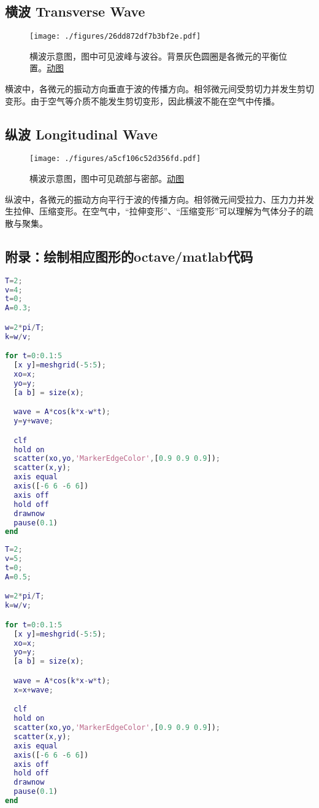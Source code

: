 
\subsection{横波 Transverse Wave}
\begin{figure}[ht]
\centering
\texttt{[image: ./figures/26dd872df7b3bf2e.pdf]}
\caption{横波示意图，图中可见波峰与波谷。背景灰色圆圈是各微元的平衡位置。\href{https://wuli.wiki/apps/waves.html}{动图}} \label{fig_LAT_1}
\end{figure}
横波中，各微元的振动方向垂直于波的传播方向。相邻微元间受剪切力并发生剪切变形。由于空气等介质不能发生剪切变形，因此横波不能在空气中传播。

\subsection{纵波 Longitudinal Wave}
\begin{figure}[ht]
\centering
\texttt{[image: ./figures/a5cf106c52d356fd.pdf]}
\caption{横波示意图，图中可见疏部与密部。\href{https://wuli.wiki/apps/waves.html}{动图}} \label{fig_LAT_2}
\end{figure}
纵波中，各微元的振动方向平行于波的传播方向。相邻微元间受拉力、压力力并发生拉伸、压缩变形。在空气中，“拉伸变形”、“压缩变形”可以理解为气体分子的疏散与聚集。

\subsection{附录：绘制相应图形的octave/matlab代码}
\begin{lstlisting}[language=matlab]
%绘制横波
T=2;
v=4;
t=0;
A=0.3;

w=2*pi/T;
k=w/v;

for t=0:0.1:5
  [x y]=meshgrid(-5:5);
  xo=x;
  yo=y;
  [a b] = size(x);

  wave = A*cos(k*x-w*t);
  y=y+wave;

  clf
  hold on
  scatter(xo,yo,'MarkerEdgeColor',[0.9 0.9 0.9]);
  scatter(x,y);
  axis equal
  axis([-6 6 -6 6])
  axis off
  hold off
  drawnow
  pause(0.1)
end

\end{lstlisting}

\begin{lstlisting}[language=matlab]
%绘制纵波
T=2;
v=5;
t=0;
A=0.5;

w=2*pi/T;
k=w/v;

for t=0:0.1:5
  [x y]=meshgrid(-5:5);
  xo=x;
  yo=y;
  [a b] = size(x);

  wave = A*cos(k*x-w*t);
  x=x+wave;

  clf
  hold on
  scatter(xo,yo,'MarkerEdgeColor',[0.9 0.9 0.9]);
  scatter(x,y);
  axis equal
  axis([-6 6 -6 6])
  axis off
  hold off
  drawnow
  pause(0.1)
end
\end{lstlisting}
